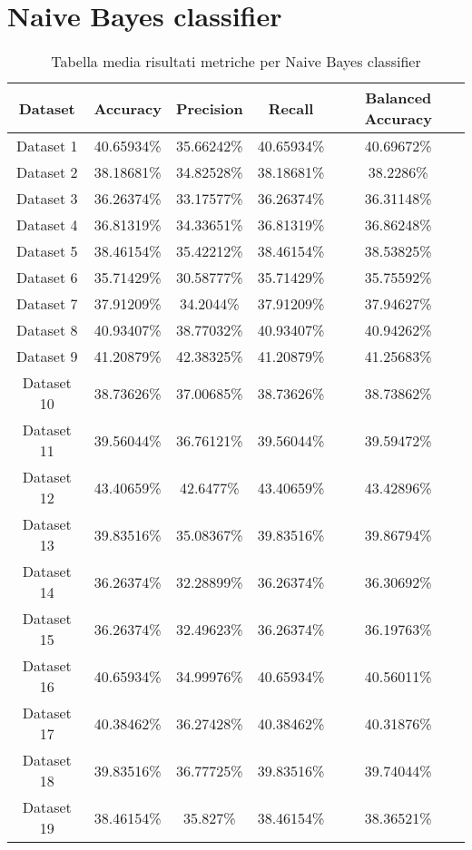\section{Naive Bayes classifier}
\begin{table}
\centering
\caption{Tabella media risultati metriche per Naive Bayes classifier}
\label{tab:4}
\begin{tabular}{ |c||c|c|c|c| } 
    \hline
    Dataset & Accuracy & Precision & Recall & Balanced Accuracy\\ 
    \hline\hline
    Dataset 1&40.65934\%&35.66242\%&40.65934\%&40.69672\%\\
    \hline
    Dataset 2&38.18681\%&34.82528\%&38.18681\%&38.2286\%\\
    \hline
    Dataset 3&36.26374\%&33.17577\%&36.26374\%&36.31148\%\\
    \hline
    Dataset 4&36.81319\%&34.33651\%&36.81319\%&36.86248\%\\
    \hline
    Dataset 5&38.46154\%&35.42212\%&38.46154\%&38.53825\%\\
    \hline
    Dataset 6&35.71429\%&30.58777\%&35.71429\%&35.75592\%\\
    \hline
    Dataset 7&37.91209\%&34.2044\%&37.91209\%&37.94627\%\\
    \hline
    Dataset 8&40.93407\%&38.77032\%&40.93407\%&40.94262\%\\
    \hline
    Dataset 9&41.20879\%&42.38325\%&41.20879\%&41.25683\%\\
    \hline
    Dataset 10&38.73626\%&37.00685\%&38.73626\%&38.73862\%\\
    \hline
    Dataset 11&39.56044\%&36.76121\%&39.56044\%&39.59472\%\\
    \hline
    Dataset 12&43.40659\%&42.6477\%&43.40659\%&43.42896\%\\
    \hline
    Dataset 13&39.83516\%&35.08367\%&39.83516\%&39.86794\%\\
    \hline
    Dataset 14&36.26374\%&32.28899\%&36.26374\%&36.30692\%\\
    \hline
    Dataset 15&36.26374\%&32.49623\%&36.26374\%&36.19763\%\\
    \hline
    Dataset 16&40.65934\%&34.99976\%&40.65934\%&40.56011\%\\
    \hline
    Dataset 17&40.38462\%&36.27428\%&40.38462\%&40.31876\%\\
    \hline
    Dataset 18&39.83516\%&36.77725\%&39.83516\%&39.74044\%\\
    \hline
    Dataset 19&38.46154\%&35.827\%&38.46154\%&38.36521\%\\

\end{tabular}
\end{table}
